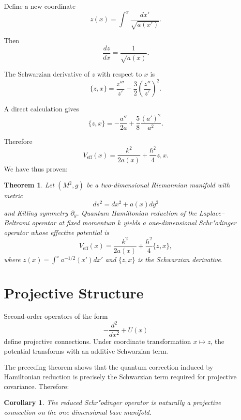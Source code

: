 \documentclass[11pt]{article}
\newtheorem{theorem}{Theorem}
\newtheorem{corollary}{Corollary}
\begin{document}
Define a new coordinate
\begin{equation}
z(x)=\int^x \frac{dx'}{\sqrt{a(x')}}.
\end{equation}

Then
\[
\frac{dz}{dx} = \frac{1}{\sqrt{a(x)}}.
\]

The Schwarzian derivative of $z$ with respect to $x$ is
\begin{equation}
\{z,x\}=\frac{z'''}{z'}-\frac{3}{2}\left(\frac{z''}{z'}\right)^2.
\end{equation}

A direct calculation gives
\begin{equation}
\{z,x\}=-\frac{a''}{2a}+\frac{5}{8}\frac{(a')^2}{a^2}.
\end{equation}

Therefore
\begin{equation}
V_{\mathrm{eff}}(x)=\frac{k^2}{2a(x)}+\frac{\hbar^2}{4}{z,x}.
\end{equation}
We have thus proven:

\begin{theorem}
Let $(M^2,g)$ be a two-dimensional Riemannian manifold with metric
\[
ds^2 = dx^2 + a(x)dy^2
\]
and Killing symmetry $\partial_y$. Quantum Hamiltonian reduction of the Laplace--Beltrami operator at fixed momentum $k$ yields a one-dimensional Schr"odinger operator whose effective potential is
\[
V_{\mathrm{eff}}(x)=\frac{k^2}{2a(x)}+\frac{\hbar^2}{4}\{z,x\},
\]
where $z(x)=\int^x a^{-1/2}(x')dx'$ and $\{z,x\}$ is the Schwarzian derivative.
\end{theorem}

\section{Projective Structure}

Second-order operators of the form
\[
-\frac{d^2}{dx^2} + U(x)
\]
define projective connections. Under coordinate transformation $x \mapsto z$, the potential 
transforms with an additive Schwarzian term.

The preceding theorem shows that the quantum correction induced by Hamiltonian reduction is precisely the Schwarzian term required for projective covariance. Therefore:

\begin{corollary}
The reduced Schr"odinger operator is naturally a projective connection on the one-dimensional base manifold.
\end{corollary}
\end{document}
